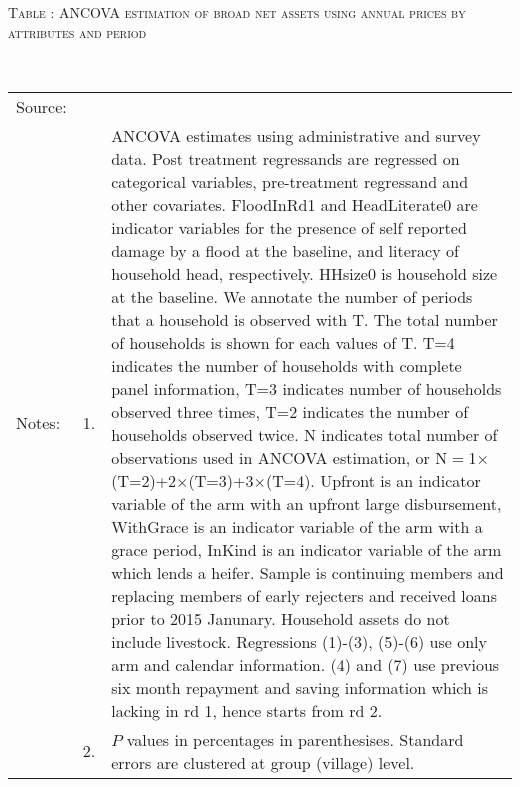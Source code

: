 \hspace{-1cm}\begin{minipage}[t]{14cm}
\hfil\textsc{\normalsize Table \thetable: ANCOVA estimation of broad net assets using annual prices by attributes and period\label{tab ANCOVA net assets using annual prices timevarying attributes}}\\
\setlength{\tabcolsep}{1pt}
\setlength{\baselineskip}{8pt}
\renewcommand{\arraystretch}{.55}
\hfil{}\\
\renewcommand{\arraystretch}{.8}
\setlength{\tabcolsep}{1pt}
\begin{tabular}{>{\hfill\scriptsize}p{1cm}<{}>{\hfill\scriptsize}p{.25cm}<{}>{\scriptsize}p{12cm}<{\hfill}}
Source:& \multicolumn{2}{l}{\scriptsize Estimated with GUK administrative and survey data.}\\
Notes: & 1. & ANCOVA estimates using administrative and survey data. Post treatment regressands are regressed on categorical variables, pre-treatment regressand and other covariates. \textsf{FloodInRd1} and \textsf{HeadLiterate0} are indicator variables for the presence of self reported damage by a flood at the baseline, and literacy of household head, respectively. \textsf{HHsize0} is household size at the baseline. We annotate the number of periods that a household is observed with \textsf{T}. The total number of households is shown for each values of \textsf{T}. \textsf{T=4} indicates the number of households with complete panel information, \textsf{T=3} indicates number of households observed three times, \textsf{T=2} indicates the number of households observed twice. \textsf{N} indicates total number of observations used in ANCOVA estimation, or \textsf{N$=$1$\times$(T=2)+2$\times$(T=3)+3$\times$(T=4)}.  \textsf{Upfront} is an indicator variable of the arm with an upfront large disbursement, \textsf{WithGrace} is an indicator variable of the arm with a grace period, \textsf{InKind} is an indicator variable of the arm which lends a heifer. Sample is continuing members and replacing members of early rejecters and received loans prior to 2015 Janunary. Household assets do not include livestock. Regressions (1)-(3), (5)-(6) use only arm and calendar information. (4) and (7) use previous six month repayment and saving information which is lacking in rd 1, hence starts from rd 2.\\
& 2. & $P$ values in percentages in parenthesises. Standard errors are clustered at group (village) level.
\end{tabular}
\end{minipage}


